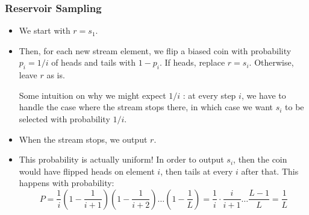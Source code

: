 \subsubsection{Reservoir Sampling}
\begin{itemize}
	\item We start with \( r = s_1 \). 
	\item Then, for each new stream element, we flip a biased coin with probability \( p_i = 1/i\) of heads and 
		tails with \( 1 - p_i \). If heads, replace \( r = s_i \). Otherwise, leave \( r \) as is.

		Some intuition on why we might expect \( 1 / i \) : at every step \( i \), we have to handle the case
		 where the stream stops there, in which case we want \( s_i \) to be selected with probability 
		 \( 1 / i \).
	\item When the stream stops, we output \( r \).
	\item This probability is actually uniform! In order to output \( s_i \), then the coin would have 
		flipped heads on element  \( i \), then tails at every \( i \) after that. This happens with probability:
		\[
		P = \frac{1}{i}\left( 1 - \frac{1}{i+1} \right)\left( 1 - \frac{1}{i+2} \right) \dots 
		\left( 1 - \frac{1}{L} \right) = \frac{1}{i} \cdot \frac{i}{i+1} \dots \frac{L-1}{L} = \frac{1}{L}
		\] 
\end{itemize}
